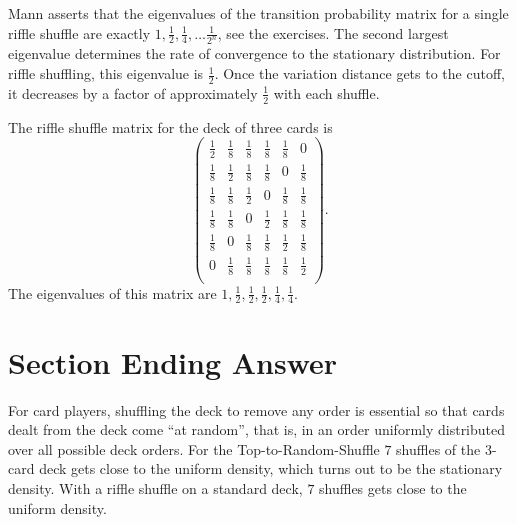 \documentclass[12pt]{article}
\begin{document}
Mann
\cite{mann94} asserts that the eigenvalues of the transition probability
matrix for a single riffle shuffle are exactly \( 1, \frac{1}{2}, \frac{1}
{4}, \dots \frac{1}{2^n} \), see the exercises.  The second largest
eigenvalue determines the rate of convergence to the stationary
distribution.  For riffle shuffling, this eigenvalue is \( \frac{1}{2} \).
Once the variation distance gets to the cutoff, it decreases by a factor
of approximately \( \frac{1}{2} \) with each shuffle.

\begin{example}
    The riffle shuffle matrix for the deck of three cards is
    \[
        \begin{pmatrix}
            \frac{1}{2} & \frac{1}{8}   & \frac{1}{8}   & \frac{1}{8}
            & \frac{1}{8}       & 0 \\
            \frac{1}{8} & \frac{1}{2}   & \frac{1}{8}   & \frac{1}{8}
            & 0 & \frac{1}{8} \\
            \frac{1}{8} & \frac{1}{8}   & \frac{1}{2}   & 0     & \frac{1}
            {8} & \frac{1}{8} \\
            \frac{1}{8} & \frac{1}{8}   & 0     & \frac{1}{2}   & \frac{1}
            {8} & \frac{1}{8} \\
            \frac{1}{8} & 0     & \frac{1}{8}   & \frac{1}{8}   & \frac{1}
            {2} & \frac{1}{8} \\
            0   & \frac{1}{8}   & \frac{1}{8}   & \frac{1}{8}   & \frac{1}
            {8} & \frac{1}{2} \\
        \end{pmatrix}
        .
    \] The eigenvalues of this matrix are \( 1, \frac{1}{2}, \frac{1}{2},
    \frac{1}{2}, \frac{1}{4}, \frac{1}{4} \).
\end{example}

\section*{Section Ending Answer}

For card players, shuffling the deck to remove any order is essential so
that cards dealt from the deck come ``at random'', that is, in an order
uniformly distributed over all possible deck orders.  For the
Top-to-Random-Shuffle \( 7 \) shuffles of the 3-card deck gets close to
the uniform density, which turns out to be the stationary density.  With
a riffle shuffle on a standard deck, \( 7 \) shuffles gets close to the
uniform density.
\end{document}
